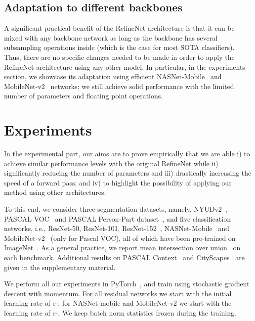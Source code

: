 \documentclass{bmvc2k}
\begin{document}
\subsection{Adaptation to different backbones}
\label{ss:ada}
A significant practical benefit of the RefineNet architecture is that it can be mixed with any backbone network as long as the backbone has several subsampling operations inside (which is the case for most SOTA classifiers). Thus, there are no specific changes needed to be made in order to apply the RefineNet architecture using any other model. In particular, in the experiments section, we showcase its adaptation using efficient NASNet-Mobile~\cite{ZophVSL17} and MobileNet-v2~\cite{abs-1801-04381} networks; we still achieve solid performance with the limited number of parameters and floating point operations.
	




\section{Experiments}
In the experimental part, our aims are to prove empirically that we are able i) to achieve similar performance levels with the original RefineNet while ii) significantly reducing the number of parameters and iii) drastically increasing the speed of a forward pass; and iv) to highlight the possibility of applying our method using other architectures.

To this end, we consider three segmentation datasets, namely, NYUDv2~\cite{SilbermanHKF12}, PASCAL VOC~\cite{EveringhamGWWZ10} and PASCAL Person-Part dataset~\cite{ChenMLFUY14,ChenYWXY16}, and five classification networks, i.e., ResNet-50, ResNet-101, ResNet-152~\cite{HeZRS16}, NASNet-Mobile~\cite{ZophVSL17} and MobileNet-v2~\cite{abs-1801-04381} (only for Pascal VOC), all of which have been pre-trained on ImageNet~\cite{DengDSLL009}. As a general practice, we report mean intersection over union~\cite{EveringhamGWWZ10} on each benchmark. Additional results on PASCAL Context~\cite{MottaghiCLCLFUY14} and CityScapes~\cite{CordtsORREBFRS16} are given in the supplementary material.
	
We perform all our experiments in PyTorch~\cite{paszke2017automatic}, and train using stochastic gradient descent with momentum. For all residual networks we start with the initial learning rate of e-, for NASNet-mobile and MobileNet-v2 we start with the learning rate of e-. We keep batch norm statistics frozen during the training.
	
\end{document}
